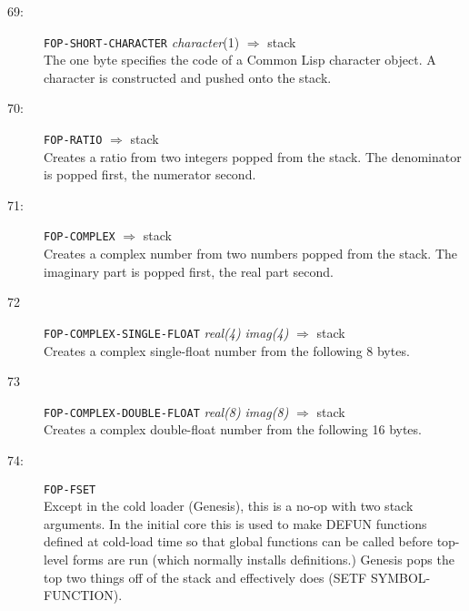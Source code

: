 \begin{description}
\item[69:] \hspace{2em} {\tt FOP-SHORT-CHARACTER} \hspace{2em} {\it character}(1) \hspace{2em}
$\Rightarrow$ \hspace{2em} stack \\
The one byte specifies the code of a Common Lisp character object.  A character
is constructed and pushed onto the stack.

\item[70:] \hspace{2em} {\tt FOP-RATIO} \hspace{2em} $\Rightarrow$ \hspace{2em} stack \\
Creates a ratio from two integers popped from the stack.
The denominator is popped first, the numerator second.

\item[71:] \hspace{2em} {\tt FOP-COMPLEX} \hspace{2em} $\Rightarrow$ \hspace{2em} stack \\
Creates a complex number from two numbers popped from the stack.
The imaginary part is popped first, the real part second.

\item[72] \hspace{2em} {\tt FOP-COMPLEX-SINGLE-FLOAT} {\it real(4)} {\it imag(4)}\hspace{2em} $\Rightarrow$ \hspace{2em} stack \\
Creates a complex single-float number from the following 8 bytes.

\item[73] \hspace{2em} {\tt FOP-COMPLEX-DOUBLE-FLOAT} {\it real(8)} {\it imag(8)}\hspace{2em} $\Rightarrow$ \hspace{2em} stack \\
Creates a complex double-float number from the following 16 bytes.


\item[74:] \hspace{2em} {\tt FOP-FSET} \hspace{2em} \\
Except in the cold loader (Genesis), this is a no-op with two stack arguments.
In the initial core this is used to make DEFUN functions defined at cold-load
time so that global functions can be called before top-level forms are run
(which normally installs definitions.)  Genesis pops the top two things off of
the stack and effectively does (SETF SYMBOL-FUNCTION).


\end{description}
